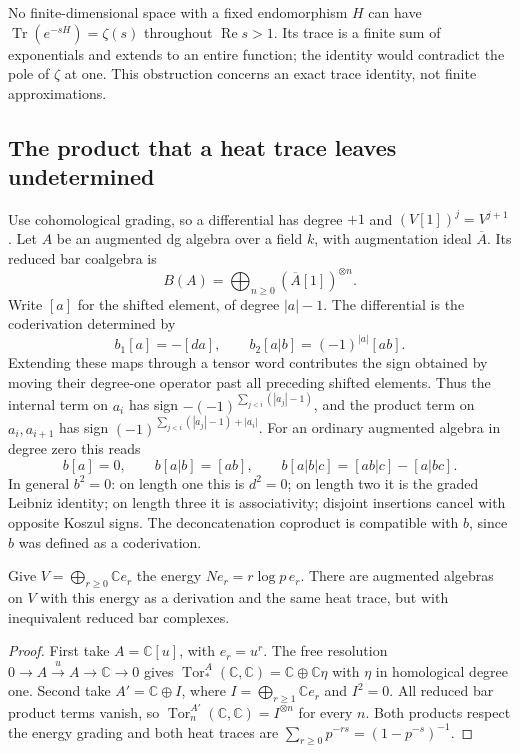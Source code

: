 No finite-dimensional space with a fixed endomorphism $H$ can have
$\operatorname{Tr}(e^{-sH})=\zeta(s)$ throughout $\operatorname{Re}s>1$.
Its trace is a finite sum of exponentials and extends to an entire function;
the identity would contradict the pole of $\zeta$ at one.
This obstruction concerns an exact trace identity, not finite approximations.

\subsection{The product that a heat trace leaves undetermined}
\label{syn-arith:bar}
Use cohomological grading, so a differential has degree $+1$ and
$(V[1])^j=V^{j+1}$.  Let $A$ be an augmented dg algebra over a field $k$,
with augmentation ideal $\overline A$.  Its reduced bar coalgebra is
\[
 B(A)=\bigoplus_{n\geq0}(\overline A[1])^{\otimes n}.
\]
Write $[a]$ for the shifted element, of degree $|a|-1$.
The differential is the coderivation determined by
\[
 b_1[a]=-[da],\qquad b_2[a|b]=(-1)^{|a|}[ab].
\]
Extending these maps through a tensor word contributes the sign obtained by
moving their degree-one operator past all preceding shifted elements.
Thus the internal term on $a_i$ has sign
$-(-1)^{\sum_{j<i}(|a_j|-1)}$, and the product term on $a_i,a_{i+1}$ has sign
$(-1)^{\sum_{j<i}(|a_j|-1)+|a_i|}$.
For an ordinary augmented algebra in degree zero this reads
\[
 b[a]=0,\qquad b[a|b]=[ab],\qquad
 b[a|b|c]=[ab|c]-[a|bc].
\]
In general $b^2=0$: on length one this is $d^2=0$; on length two it is the
graded Leibniz identity; on length three it is associativity; disjoint
insertions cancel with opposite Koszul signs.  The deconcatenation coproduct
is compatible with $b$, since $b$ was defined as a coderivation.

\begin{proposition}
\label{syn-arith:two-bars}
Give $V=\bigoplus_{r\geq0}\mathbb Ce_r$ the energy $Ne_r=r\log p\,e_r$.
There are augmented algebras on $V$ with this energy as a derivation and the
same heat trace, but with inequivalent reduced bar complexes.
\end{proposition}
\begin{proof}
First take $A=\mathbb C[u]$, with $e_r=u^r$.  The free resolution
$0\to A\xrightarrow{u}A\to\mathbb C\to0$ gives
$\operatorname{Tor}^A_*(\mathbb C,\mathbb C)=\mathbb C\oplus\mathbb C\eta$
with $\eta$ in homological degree one.
Second take $A'=\mathbb C\oplus I$, where
$I=\bigoplus_{r\geq1}\mathbb Ce_r$ and $I^2=0$.
All reduced bar product terms vanish, so
$\operatorname{Tor}^{A'}_n(\mathbb C,\mathbb C)=I^{\otimes n}$ for every $n$.
Both products respect the energy grading and both heat traces are
$\sum_{r\geq0}p^{-rs}=(1-p^{-s})^{-1}$.
\end{proof}

